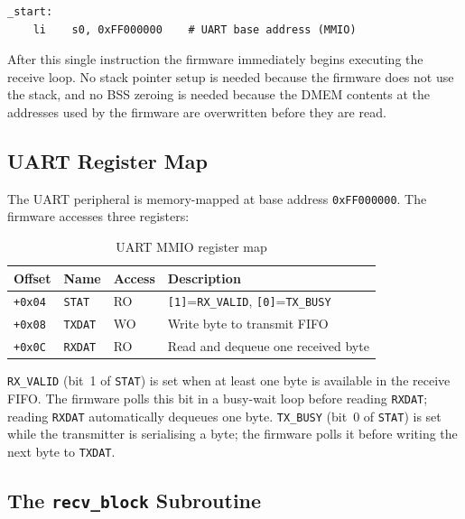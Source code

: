 \begin{lstlisting}[language=RISCV, caption={Firmware entry point: minimal initialisation}]
_start:
    li    s0, 0xFF000000    # UART base address (MMIO)
\end{lstlisting}

After this single instruction the firmware immediately begins executing the receive loop.
No stack pointer setup is needed because the firmware does not use the stack, and no BSS
zeroing is needed because the DMEM contents at the addresses used by the firmware are
overwritten before they are read.

\subsection{UART Register Map}

The UART peripheral is memory-mapped at base address \texttt{0xFF000000}. The firmware
accesses three registers:

\begin{table}[H]
  \centering
  \caption{UART MMIO register map}
  \label{tab:uart_mmio}
  \begin{tabular}{llll}
    \toprule
    \textbf{Offset} & \textbf{Name} & \textbf{Access} & \textbf{Description} \\
    \midrule
    \texttt{+0x04} & \texttt{STAT}  & RO & \texttt{[1]}=\texttt{RX\_VALID}, \texttt{[0]}=\texttt{TX\_BUSY} \\
    \texttt{+0x08} & \texttt{TXDAT} & WO & Write byte to transmit FIFO \\
    \texttt{+0x0C} & \texttt{RXDAT} & RO & Read and dequeue one received byte \\
    \bottomrule
  \end{tabular}
\end{table}

\texttt{RX\_VALID} (bit~1 of \texttt{STAT}) is set when at least one byte is available
in the receive FIFO. The firmware polls this bit in a busy-wait loop before reading
\texttt{RXDAT}; reading \texttt{RXDAT} automatically dequeues one byte.
\texttt{TX\_BUSY} (bit~0 of \texttt{STAT}) is set while the transmitter is serialising
a byte; the firmware polls it before writing the next byte to \texttt{TXDAT}.

\subsection{The \texttt{recv\_block} Subroutine}


